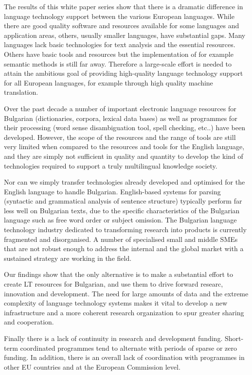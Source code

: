 \documentclass[]{../../metanetpaper}
\begin{document}
\begin{multicols}{2}
The results of this white paper series show that there is a dramatic difference in language technology support between the various European languages. While there are good quality software and resources available for some languages and application areas, others, usually smaller languages, have substantial gaps. Many languages lack basic technologies for text analysis and the essential resources. Others have basic tools and resources but the implementation of for example semantic methods is still far away. Therefore a large-scale effort is needed to attain the ambitious goal of providing high-quality language technology support for all European languages, for example through high quality machine translation. 

Over the past decade a number of important electronic language resources for Bulgarian (dictionaries, corpora, lexical data bases) as well as programmes for their processing (word sense disambiguation tool, spell checking, etc..) have been developed. However, the scope of the resources and the range of tools are still very limited when compared to the resources and tools for the English language, and they are simply not sufficient in quality and quantity to develop the kind of technologies required to support a truly multilingual knowledge society.
\columnbreak

Nor can we simply transfer technologies already developed and optimised for the English language to handle Bulgarian. English-based systems for parsing (syntactic and grammatical analysis of sentence structure) typically perform far less well on Bulgarian texts, due to the specific characteristics of the Bulgarian language such as free word order or subject omission.
The Bulgarian language technology industry dedicated to transforming research into products is currently fragmented and disorganised. A number of specialised small and middle SMEs that are not robust enough to address the internal and the global market with a sustained strategy are working in the field.

Our findings show that the only alternative is to make a substantial effort to create LT resources for Bulgarian, and use them to drive forward researc, innovation and development. The need for large amounts of data and the extreme complexity of language technology systems makes it vital to develop a new infrastructure and a more coherent research organization to spur greater sharing and cooperation.

Finally there is a lack of continuity in research and development funding. Short-term coordinated programmes tend to alternate with periods of sparse or zero funding. In addition, there is an overall lack of coordination with programmes in other EU countries and at the European Commission level.


\end{multicols}
\end{document}
